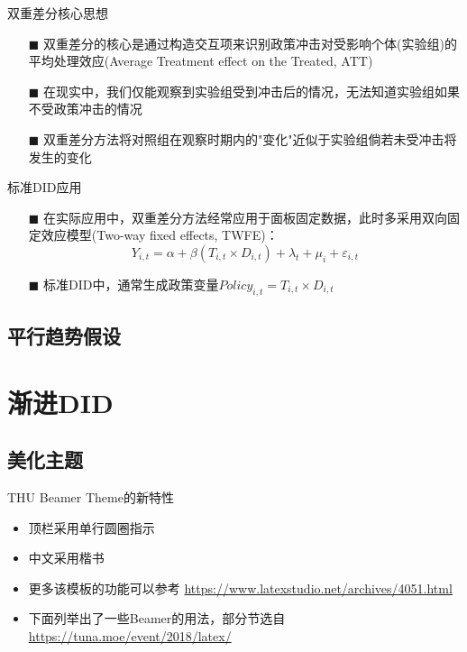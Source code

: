 \documentclass[aspectratio=169]{beamer}
\begin{document}
\begin{frame}{双重差分核心思想}
    \begin{itemize}
        \item[$\blacksquare$] 双重差分的核心是通过构造交互项来识别政策冲击对受影响个体(实验组)的平均处理效应(Average Treatment effect on the Treated, ATT)
        \item[$\blacksquare$] 在现实中，我们仅能观察到实验组受到冲击后的情况，无法知道实验组如果不受政策冲击的情况
        \item[$\blacksquare$] 双重差分方法将对照组在观察时期内的"变化"近似于实验组倘若未受冲击将发生的变化
    \end{itemize}
\end{frame}

\begin{frame}{标准DID应用}
    \begin{itemize}
        \item[$\blacksquare$] 在实际应用中，双重差分方法经常应用于面板固定数据，此时多采用双向固定效应模型(Two-way fixed effects, TWFE)：
        \begin{equation*}
            Y_{i,t}=\alpha+\beta (T_{i,t}\times D_{i,t})+\lambda_t+\mu_i+\varepsilon_{i,t}
        \end{equation*}
        \item[$\blacksquare$] 标准DID中，通常生成政策变量$Policy_{i,t}=T_{i,t}\times D_{i,t}$
    \end{itemize}
\end{frame}

\subsection{平行趋势假设}




\section{渐进DID}

\subsection{美化主题}

\begin{frame}{THU Beamer Theme的新特性}
    \begin{itemize}
        \item 顶栏采用单行圆圈指示
        \item 中文采用楷书
        \item 更多该模板的功能可以参考 \url{https://www.latexstudio.net/archives/4051.html}
        \item 下面列举出了一些Beamer的用法，部分节选自 \url{https://tuna.moe/event/2018/latex/}
    \end{itemize}
\end{frame}
\end{document}

